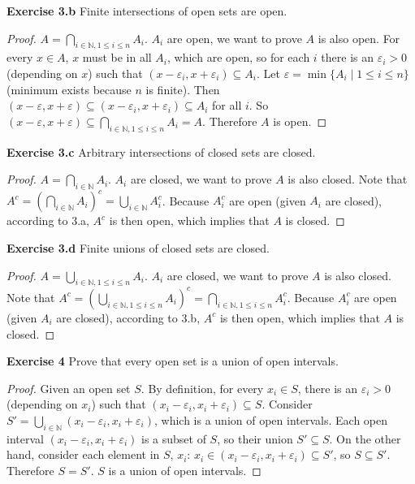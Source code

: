 \documentclass[12pt]{article}
\newcommand{\bbN}{\mathbb{N}}
\theoremstyle{definition}
\numberwithin{equation}{subsection}
\begin{document}
\textbf{Exercise 3.b} Finite intersections of open sets are open.
\begin{proof}
    $A=\bigcap_{i \in \mathbb{N}, 1 \leq i \leq n} A_{i}$. $A_i$ are open, we want to prove $A$ is also open. For every $x \in A$, $x$ must be in all $A_i$, which are open, so for each $i$ there is an $\varepsilon_i>0 $ (depending on $x$) such that $(x-\varepsilon_i, x+\varepsilon_i) \subseteq A_i.$ Let $\varepsilon = \min\{A_i\mid 1 \leq i \leq n\}$ (minimum exists because $n$ is finite). Then $(x-\varepsilon, x+\varepsilon) \subseteq (x-\varepsilon_i, x+\varepsilon_i) \subseteq A_i$ for all $i$. So $(x-\varepsilon, x+\varepsilon) \subseteq \bigcap_{i \in \mathbb{N}, 1 \leq i \leq n} A_{i} = A$. Therefore $A$ is open. 
\end{proof}

\textbf{Exercise 3.c} Arbitrary intersections of closed sets are closed.
\begin{proof}
    $A=\bigcap_{i \in \mathbb{N}} A_{i}$. $A_i$ are closed, we want to prove $A$ is also closed. Note that $A^c=(\bigcap_{i \in \mathbb{N}} A_{i})^c = \bigcup_{i \in \mathbb{N}} A_{i}^c$. Because $A_{i}^c$ are open (given $A_i$ are closed), according to 3.a, $A^c$ is then open, which implies that $A$ is closed. 
\end{proof}

\textbf{Exercise 3.d} Finite unions of closed sets are closed.
\begin{proof}
    $A=\bigcup_{i \in \mathbb{N}, 1 \leq i \leq n} A_{i}$. $A_i$ are closed, we want to prove $A$ is also closed. Note that $A^c=(\bigcup_{i \in \mathbb{N}, 1 \leq i \leq n} A_{i})^c = \bigcap_{i \in \mathbb{N}, 1 \leq i \leq n} A_{i}^c$. Because $A_{i}^c$ are open (given $A_i$ are closed), according to 3.b, $A^c$ is then open, which implies that $A$ is closed. 
\end{proof}

\textbf{Exercise 4} Prove that every open set is a union of open intervals.
\begin{proof}
    Given an open set $S$. By definition, for every $x_i \in S$, there is an $\varepsilon_i>0 $ (depending on $x_i$) such that $(x_i-\varepsilon_i, x_i+\varepsilon_i) \subseteq S$. Consider $S' = \bigcup_{i\in \bbN} (x_i-\varepsilon_i, x_i+\varepsilon_i)$, which is a union of open intervals. Each open interval $(x_i-\varepsilon_i, x_i+\varepsilon_i)$ is a subset of $S$, so their union $S' \subseteq S$. On the other hand, consider each element in $S$, $x_i$: $x_i \in (x_i-\varepsilon_i, x_i+\varepsilon_i) \subseteq S'$, so $S \subseteq S'$. Therefore $S = S'$. $S$ is a union of open intervals. 
\end{proof}
\end{document}
